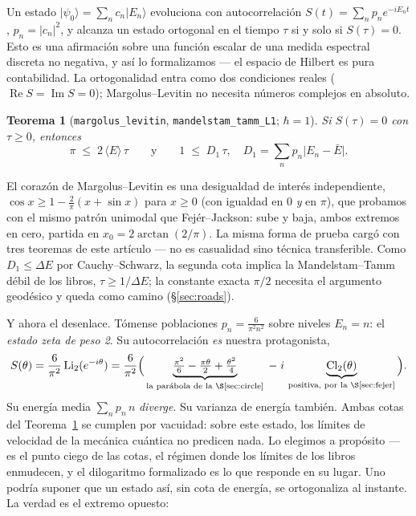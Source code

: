\documentclass[11pt]{article}
\newtheorem{theorem}{Teorema}
\newcommand{\lean}[1]{\texttt{#1}}
\newcommand{\Li}{\mathrm{Li}_2}
\newcommand{\Cl}{\mathrm{Cl}_2}
\begin{document}
Un estado $\lvert\psi_0\rangle=\sum_n c_n\lvert E_n\rangle$ evoluciona con
autocorrelaci\'on $S(t)=\sum_n p_n e^{-iE_nt}$, $p_n=\lvert c_n\rvert^2$, y alcanza un
estado ortogonal en el tiempo $\tau$ si y solo si $S(\tau)=0$. Esto es una afirmaci\'on
sobre una funci\'on escalar de una medida espectral discreta no negativa, y as\'i lo
formalizamos --- el espacio de Hilbert es pura contabilidad. La ortogonalidad entra como dos
condiciones reales ($\operatorname{Re}S=\operatorname{Im}S=0$); Margolus--Levitin no
necesita n\'umeros complejos en absoluto.

\begin{theorem}[{\lean{margolus\_levitin}, \lean{mandelstam\_tamm\_L1}}; $\hbar=1$]
\label{thm:qsl}
Si $S(\tau)=0$ con $\tau\ge0$, entonces
\[
\pi \;\le\; 2\,\langle E\rangle\,\tau
\qquad\text{y}\qquad
1 \;\le\; D_1\,\tau,
\quad D_1=\textstyle\sum_n p_n\lvert E_n-\bar E\rvert .
\]
\end{theorem}

El coraz\'on de Margolus--Levitin es una desigualdad de inter\'es independiente,
$\cos x\ge 1-\tfrac{2}{\pi}(x+\sin x)$ para $x\ge0$ (con igualdad en $0$ \emph{y} en
$\pi$), que probamos con el mismo patr\'on unimodal que Fej\'er--Jackson: sube y baja,
ambos extremos en cero, partida en $x_0=2\arctan(2/\pi)$. La misma forma de prueba
carg\'o con tres teoremas de este art\'iculo --- no es casualidad sino t\'ecnica
transferible. Como $D_1\le\Delta E$ por Cauchy--Schwarz, la segunda cota implica la
Mandelstam--Tamm d\'ebil de los libros, $\tau\ge1/\Delta E$; la constante exacta $\pi/2$
necesita el argumento geod\'esico y queda como camino (\S\ref{sec:roads}).

Y ahora el desenlace. T\'omense poblaciones $p_n=\frac{6}{\pi^2 n^2}$ sobre niveles
$E_n=n$: el \emph{estado zeta de peso 2}. Su autocorrelaci\'on \emph{es} nuestra
protagonista,
\[
S(\theta)=\frac{6}{\pi^2}\,\Li(e^{-i\theta})
=\frac{6}{\pi^2}\Big(
\underbrace{\tfrac{\pi^2}{6}-\tfrac{\pi\theta}{2}+\tfrac{\theta^2}{4}}_{\text{la
par\'abola de la \S\ref{sec:circle}}}
\;-\;i\,\underbrace{\Cl(\theta)}_{\text{positiva, por la \S\ref{sec:fejer}}}\Big).
\]
Su energ\'ia media $\sum_n p_n\,n$ \emph{diverge}. Su varianza de energ\'ia tambi\'en.
Ambas cotas del Teorema~\ref{thm:qsl} se cumplen por vacuidad: sobre este estado, los
l\'imites de velocidad de la mec\'anica cu\'antica no predicen nada. Lo elegimos a
prop\'osito --- es el punto ciego de las cotas, el r\'egimen donde los l\'imites de los
libros enmudecen, y el dilogaritmo formalizado es lo que responde en su lugar. Uno
podr\'ia suponer que un estado as\'i, sin cota de energ\'ia, se ortogonaliza al
instante. La verdad es el extremo opuesto:
\end{document}
